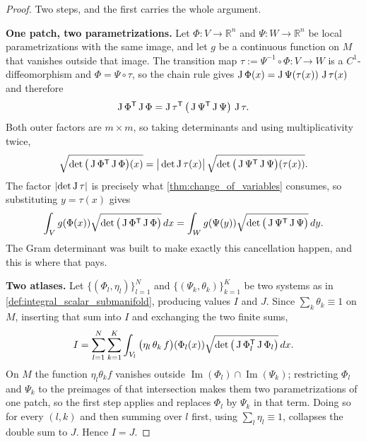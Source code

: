 \begin{proof}
Two steps, and the first carries the whole argument.

\textbf{One patch, two parametrizations.} Let $\Phi : V \to \mathbb{R}^n$ and
$\Psi : W \to \mathbb{R}^n$ be local parametrizations with the same image, and let $g$ be a
continuous function on $M$ that vanishes outside that image. The transition map
$\tau := \Psi^{-1}\circ\Phi : V \to W$ is a $C^1$-diffeomorphism and $\Phi = \Psi\circ\tau$, so
the chain rule gives $\operatorname{J}\Phi(x) = \operatorname{J}\Psi(\tau(x))\,\operatorname{J}\tau(x)$ and therefore
\[\operatorname{J}\Phi^{\mathsf{T}}\operatorname{J}\Phi
  = \operatorname{J}\tau^{\mathsf{T}}\,\big(\operatorname{J}\Psi^{\mathsf{T}}\operatorname{J}\Psi\big)\,\operatorname{J}\tau .\]
Both outer factors are $m \times m$, so taking determinants and using multiplicativity twice,
\[\sqrt{\det\big(\operatorname{J}\Phi^{\mathsf{T}}\operatorname{J}\Phi\big)(x)}
  = \big\lvert\det\operatorname{J}\tau(x)\big\rvert\,
    \sqrt{\det\big(\operatorname{J}\Psi^{\mathsf{T}}\operatorname{J}\Psi\big)(\tau(x))} .\]
The factor $\lvert\det\operatorname{J}\tau\rvert$ is precisely what \cref{thm:change_of_variables} consumes,
so substituting $y = \tau(x)$ gives
\[\int_V g(\Phi(x))\sqrt{\det\big(\operatorname{J}\Phi^{\mathsf{T}}\operatorname{J}\Phi\big)}\,dx
  = \int_W g(\Psi(y))\sqrt{\det\big(\operatorname{J}\Psi^{\mathsf{T}}\operatorname{J}\Psi\big)}\,dy .\]
The Gram determinant was built to make exactly this cancellation happen, and this is where that
pays.

\textbf{Two atlases.} Let $\{(\Phi_l,\eta_l)\}_{l=1}^N$ and $\{(\Psi_k,\theta_k)\}_{k=1}^K$ be two
systems as in \cref{def:integral_scalar_submanifold}, producing values $I$ and $J$. Since
$\sum_{k}\theta_k \equiv 1$ on $M$, inserting that sum into $I$ and exchanging the two finite sums,
\[I = \sum_{l=1}^N\sum_{k=1}^K \int_{V_l}
      \big(\eta_l\,\theta_k\,f\big)(\Phi_l(x))
      \sqrt{\det\big(\operatorname{J}\Phi_l^{\mathsf{T}}\operatorname{J}\Phi_l\big)}\,dx .\]
On $M$ the function $\eta_l\theta_k f$ vanishes outside
$\operatorname{Im}(\Phi_l)\cap\operatorname{Im}(\Psi_k)$; restricting $\Phi_l$ and $\Psi_k$ to the
preimages of that intersection makes them two parametrizations of one patch, so the first step
applies and replaces $\Phi_l$ by $\Psi_k$ in that term. Doing so for every $(l,k)$ and then summing
over $l$ first, using $\sum_l\eta_l \equiv 1$, collapses the double sum to $J$. Hence $I = J$.
\end{proof}

